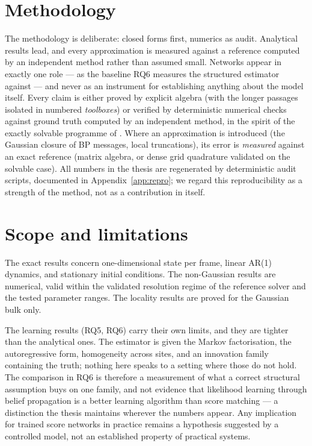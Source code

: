 \section{Methodology}

The methodology is deliberate: closed forms first, numerics as audit.
Analytical results lead, and every approximation is measured against a
reference computed by an independent method rather than assumed small.
Networks appear in exactly one role --- as the baseline RQ6 measures the
structured estimator against --- and never as an instrument for
establishing anything about the model itself. Every claim is either proved by
explicit algebra (with the longer passages isolated in numbered
\emph{toolboxes}) or verified by deterministic numerical checks against
ground truth computed by an independent method, in the spirit of the
exactly solvable programme of \citet{biroli2023generative}. Where an
approximation is introduced (the Gaussian closure of BP messages, local
truncations), its error is \emph{measured} against an exact reference
(matrix algebra, or dense grid quadrature validated on the solvable
case). All numbers in the thesis are regenerated by deterministic audit
scripts, documented in Appendix~\ref{app:repro}; we regard this
reproducibility as a strength of the method, not as a contribution in
itself.

\section{Scope and limitations}

The exact results concern one-dimensional state per frame, linear AR(1)
dynamics, and stationary initial conditions. The non-Gaussian results
are numerical, valid within the validated resolution regime of the
reference solver and the tested parameter ranges. The locality results
are proved for the Gaussian bulk only.

The learning results (RQ5, RQ6) carry their own limits, and they are
tighter than the analytical ones. The estimator is given the Markov
factorisation, the autoregressive form, homogeneity across sites, and an
innovation family containing the truth; nothing here speaks to a setting
where those do not hold. The comparison in RQ6 is therefore a measurement
of what a correct structural assumption buys on one family, and not
evidence that likelihood learning through belief propagation is a better
learning algorithm than score matching --- a distinction the thesis
maintains wherever the numbers appear. Any implication for trained score
networks in practice remains a hypothesis suggested by a controlled
model, not an established property of practical systems.

